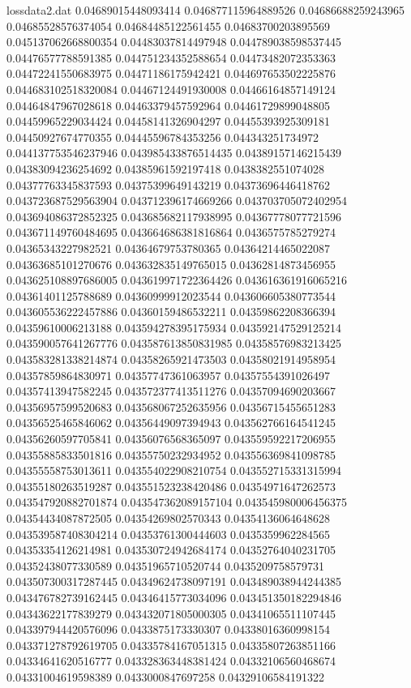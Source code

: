 \begin{filecontents*}{lossdata2.dat}
0.04689015448093414
0.046877115964889526
0.04686688259243965
0.04685528576374054
0.04684485122561455
0.04683700203895569
0.045137062668800354
0.04483037814497948
0.044789038598537445
0.04476577788591385
0.044751234352588654
0.04473482072353363
0.04472241550683975
0.04471186175942421
0.044697653502225876
0.044683102518320084
0.04467124491930008
0.04466164857149124
0.04464847967028618
0.04463379457592964
0.04461729899048805
0.04459965229034424
0.04458141326904297
0.04455393925309181
0.04450927674770355
0.04445596784353256
0.044343251734972
0.044137753546237946
0.043985433876514435
0.04389157146215439
0.04383094236254692
0.04385961592197418
0.0438382551074028
0.04377763345837593
0.04375399649143219
0.04373696446418762
0.043723687529563904
0.043712396174669266
0.043703705072402954
0.043694086372852325
0.043685682117938995
0.04367778077721596
0.043671149760484695
0.043664686381816864
0.0436575785279274
0.04365343227982521
0.04364679753780365
0.04364214465022087
0.04363685101270676
0.043632835149765015
0.04362814873456955
0.043625108897686005
0.043619971722364426
0.043616361916065216
0.04361401125788689
0.04360999912023544
0.043606605380773544
0.043605536222457886
0.04360159486532211
0.04359862208366394
0.04359610006213188
0.043594278395175934
0.043592147529125214
0.043590057641267776
0.043587613850831985
0.04358576983213425
0.043583281338214874
0.04358265921473503
0.04358021914958954
0.04357859864830971
0.04357747361063957
0.04357554391026497
0.04357413947582245
0.043572377413511276
0.04357094690203667
0.04356957599520683
0.043568067252635956
0.04356715455651283
0.04356525465846062
0.04356449097394943
0.043562766164541245
0.04356260597705841
0.04356076568365097
0.043559592217206955
0.04355885833501816
0.04355750232934952
0.043556369841098785
0.04355558753013611
0.043554022908210754
0.043552715331315994
0.04355180263519287
0.043551523238420486
0.04354971647262573
0.043547920882701874
0.043547362089157104
0.043545980006456375
0.04354434087872505
0.04354269802570343
0.04354136064648628
0.043539587408304214
0.04353761300444603
0.0435359962284565
0.04353354126214981
0.043530724942684174
0.04352764040231705
0.04352438077330589
0.04351965710520744
0.0435209758579731
0.043507300317287445
0.04349624738097191
0.043489038944244385
0.043476782739162445
0.04346415773034096
0.043451350182294846
0.04343622177839279
0.043432071805000305
0.04341065511107445
0.043397944420576096
0.0433875173330307
0.04338016360998154
0.043371278792619705
0.04335784167051315
0.04335807263851166
0.04334641620516777
0.043328363448381424
0.04332106560468674
0.04331004619598389
0.0433000847697258
0.04329106584191322

\end{filecontents*}

